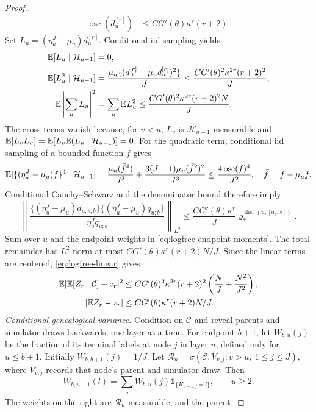 \documentclass[11pt]{article}
\theoremstyle{thmstylethree}%
\begin{document}
\begin{proof}[Proof.]
{\begin{align}
\operatorname{osc}(d_u^{[r]})&\leq CG'(\theta)\kappa^r(r+2).
\end{align}
Set $L_u=(\eta_u^J-\mu_u)d_u^{[r]}$. Conditional iid sampling yields
\begin{align}
\mathbb{E}[L_u\mid\mathcal H_{u-1}]&=0,\notag\\
\mathbb{E}[L_u^2\mid\mathcal H_{u-1}]
&=\frac{\mu_u\{(d_u^{[r]}-\mu_ud_u^{[r]})^2\}}{J}
\leq\frac{CG'(\theta)^2\kappa^{2r}(r+2)^2}{J},\notag\\
\mathbb{E}\left|\sum_uL_u\right|^2
&=\sum_u\mathbb{E} L_u^2
\leq\frac{CG'(\theta)^2\kappa^{2r}(r+2)^2N}{J}.
\label{eq:logfree-linear}
\end{align}
The cross terms vanish because, for $v<u$, $L_v$ is
$\mathcal H_{u-1}$-measurable and
$\mathbb{E}[L_vL_u]=\mathbb{E}[L_v\mathbb{E}(L_u\mid\mathcal H_{u-1})]=0$.
\endgraf
For the quadratic term, conditional iid sampling of a bounded function
$f$ gives
\[
\mathbb{E}[\{(\eta_u^J-\mu_u)f\}^4\mid\mathcal H_{u-1}]
=\frac{\mu_u(\bar f^4)}{J^3}
 +\frac{3(J-1)\mu_u(\bar f^2)^2}{J^3}
\leq\frac{4\operatorname{osc}(f)^4}{J^2},\quad \bar f=f-\mu_uf.
\]
Conditional Cauchy--Schwarz and the denominator bound therefore imply
\begin{equation}
\left\|\frac{\{(\eta_u^J-\mu_u)d_{u;s,b}\}
                 \{(\eta_u^J-\mu_u)q_{u;b}\}}
                {\eta_u^Jq_{u;b}}\right\|_{L^2}
\leq\frac{CG'(\theta)\kappa^r}{J}
 \varrho_*^{\operatorname{dist}(u,[a_s,s])}.
\end{equation}
Sum over $u$ and the endpoint weights in \eqref{eq:logfree-endpoint-moments}.
The total remainder has $L^2$ norm at most
$CG'(\theta)\kappa^r(r+2)N/J$. Since the linear terms are centered,
\eqref{eq:logfree-linear} gives
\begin{align}
\mathbb{E}|\mathbb{E}[Z_r\mid\mathcal C]-z_r|^2
&\leq CG'(\theta)^2\kappa^{2r}(r+2)^2
 \left(\frac NJ+\frac{N^2}{J^2}\right),\notag\\
|\mathbb{E} Z_r-z_r|&\leq CG'(\theta)\kappa^r(r+2)N/J.
\label{eq:logfree-mean}
\end{align}
\endgraf
\emph{Conditional genealogical variance.}
Condition on $\mathcal C$ and reveal parents and simulator draws
backwards, one layer at a time.
For endpoint $b+1$, let $W_{b,u}(j)$ be the fraction of its terminal
labels at node $j$ in layer $u$, defined only for $u\leq b+1$.
Initially $W_{b,b+1}(j)=1/J$. Let
$\mathcal R_u=\sigma(\mathcal C,V_{v,j}:v>u,\ 1\leq j\leq J)$,
where $V_{v,j}$ records that node's parent and simulator draw. Then
\[
W_{b,u-1}(l)=\sum_jW_{b,u}(j)\mathbf1_{\{K_{u-1,j}=l\}},\qquad u\geq2.
\]
The weights on the right are $\mathcal R_u$-measurable, and the parent
}
\end{proof}
\end{document}

